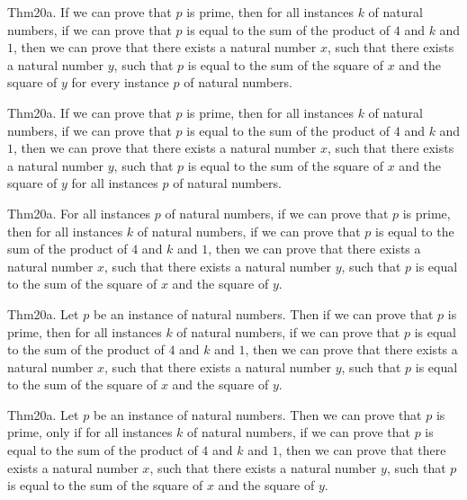 \documentclass{article}
\begin{document}
Thm20a. If we can prove that $p$ is prime, then for all instances $k$ of natural numbers, if we can prove that $p$ is equal to the sum of the product of $4$ and $k$ and $1$, then we can prove that there exists a natural number $x$, such that there exists a natural number $y$, such that $p$ is equal to the sum of the square of $x$ and the square of $y$ for every instance $p$ of natural numbers.

Thm20a. If we can prove that $p$ is prime, then for all instances $k$ of natural numbers, if we can prove that $p$ is equal to the sum of the product of $4$ and $k$ and $1$, then we can prove that there exists a natural number $x$, such that there exists a natural number $y$, such that $p$ is equal to the sum of the square of $x$ and the square of $y$ for all instances $p$ of natural numbers.

Thm20a. For all instances $p$ of natural numbers, if we can prove that $p$ is prime, then for all instances $k$ of natural numbers, if we can prove that $p$ is equal to the sum of the product of $4$ and $k$ and $1$, then we can prove that there exists a natural number $x$, such that there exists a natural number $y$, such that $p$ is equal to the sum of the square of $x$ and the square of $y$.

Thm20a. Let $p$ be an instance of natural numbers. Then if we can prove that $p$ is prime, then for all instances $k$ of natural numbers, if we can prove that $p$ is equal to the sum of the product of $4$ and $k$ and $1$, then we can prove that there exists a natural number $x$, such that there exists a natural number $y$, such that $p$ is equal to the sum of the square of $x$ and the square of $y$.

Thm20a. Let $p$ be an instance of natural numbers. Then we can prove that $p$ is prime, only if for all instances $k$ of natural numbers, if we can prove that $p$ is equal to the sum of the product of $4$ and $k$ and $1$, then we can prove that there exists a natural number $x$, such that there exists a natural number $y$, such that $p$ is equal to the sum of the square of $x$ and the square of $y$.
\end{document}
